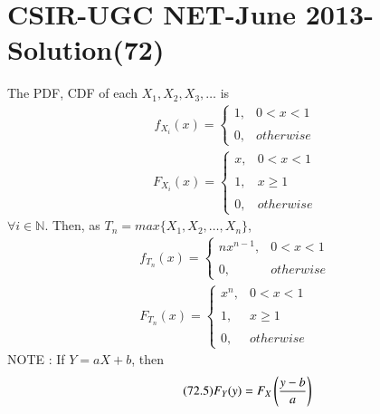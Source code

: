 \documentclass[journal,12pt,twocolumn]{IEEEtran}
\begin{document}
\section*{CSIR-UGC NET-June 2013-Solution(72)}
The PDF, CDF of each $X_{1},X_{2},X_{3},\dots$ is 
\begin{align}
\tag{72.1}
    f_{X_{i}}(x)=\begin{cases}
	1, & 0< x<1 \\~\\[-1em]
	0, & otherwise
	\end{cases} 
\end{align}
\begin{align}
\tag{72.2}
	F_{X_{i}}(x)=\begin{cases}
	x, & 0< x<1 \\~\\[-1em]
	1, & x\geq 1\\~\\[-1em]
	0, & otherwise
	\end{cases} 
\end{align}
$\forall i\in \mathbb{N}$.
Then, as $T_{n}=max\{ X_{1},X_{2},\dots,X_{n}\}$,
\begin{align}
\tag{72.3}
    f_{T_{n}}(x)=\begin{cases}
	nx^{n-1}, & 0< x<1 \\~\\[-1em]
	0, & otherwise
	\end{cases} \\
\tag{72.4}
	F_{T_{n}}(x)=\begin{cases}
	x^{n}, & 0< x<1 \\~\\[-1em]
	1, & x\geq 1\\~\\[-1em]
	0, & otherwise
	\end{cases} 
\end{align}
NOTE : If $Y=aX+b$, then
\begin{align}
\tag{72.5}
\label{eq:form}
    F_{Y}(y)=F_{X}\left(\dfrac{y-b}{a}\right)
\end{align}
\end{document}
